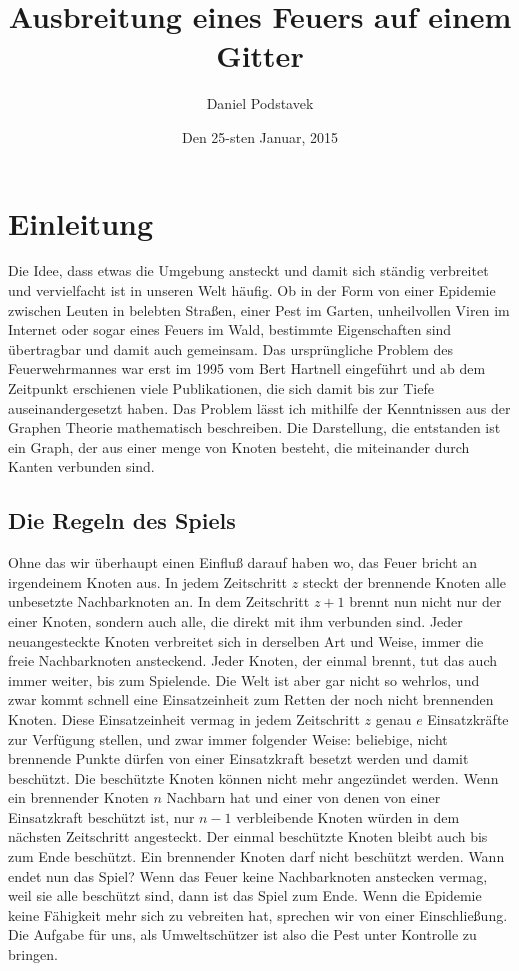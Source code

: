 \documentclass{article}
\title{Ausbreitung eines Feuers auf einem Gitter}
\author{Daniel Podstavek}
\date {Den 25-sten Januar, 2015}
\begin{document}
\maketitle


\section{Einleitung}
Die Idee, dass etwas die Umgebung ansteckt und damit sich ständig verbreitet und vervielfacht ist in unseren Welt häufig. Ob in der Form von einer Epidemie zwischen Leuten in belebten Straßen, einer Pest im Garten, unheilvollen Viren im Internet oder sogar eines Feuers im Wald, bestimmte Eigenschaften sind übertragbar und damit auch gemeinsam. Das ursprüngliche Problem des Feuerwehrmannes war erst im 1995 vom Bert Hartnell eingeführt und ab dem Zeitpunkt erschienen viele Publikationen, die sich damit bis zur Tiefe auseinandergesetzt haben. Das Problem lässt ich mithilfe der Kenntnissen aus der Graphen Theorie mathematisch beschreiben. Die Darstellung, die entstanden ist ein Graph, der aus einer menge von Knoten besteht, die miteinander durch Kanten verbunden sind.

\subsection{Die Regeln des Spiels}
Ohne das wir überhaupt einen Einfluß darauf haben wo, das Feuer bricht an irgendeinem Knoten aus. In jedem Zeitschritt $z$ steckt der brennende Knoten alle unbesetzte Nachbarknoten an. In dem Zeitschritt $z + 1$ brennt nun nicht nur der einer Knoten, sondern auch alle, die direkt mit ihm verbunden sind. Jeder neuangesteckte Knoten verbreitet sich in derselben Art und Weise, immer die freie Nachbarknoten ansteckend. Jeder Knoten, der einmal brennt, tut das auch immer weiter, bis zum Spielende. Die Welt ist aber gar nicht so wehrlos, und zwar kommt schnell eine Einsatzeinheit zum Retten der noch nicht brennenden Knoten. Diese Einsatzeinheit vermag in jedem Zeitschritt $z$ genau $e$ Einsatzkräfte zur Verfügung stellen, und zwar immer folgender Weise: beliebige, nicht brennende Punkte dürfen von einer Einsatzkraft besetzt werden und damit beschützt. Die beschützte Knoten können nicht mehr angezündet werden. Wenn ein brennender Knoten $n$ Nachbarn hat und einer von denen von einer Einsatzkraft beschützt ist, nur $n - 1$ verbleibende Knoten würden in dem nächsten Zeitschritt angesteckt. Der einmal beschützte Knoten bleibt auch bis zum Ende beschützt. Ein brennender Knoten darf nicht beschützt werden. Wann endet nun das Spiel? Wenn das Feuer keine Nachbarknoten anstecken vermag, weil sie alle beschützt sind, dann ist das Spiel zum Ende. Wenn die Epidemie keine Fähigkeit mehr sich zu vebreiten hat, sprechen wir von einer Einschließung. Die Aufgabe für uns, als Umweltschützer ist also die Pest unter Kontrolle zu bringen.
\end{document}
